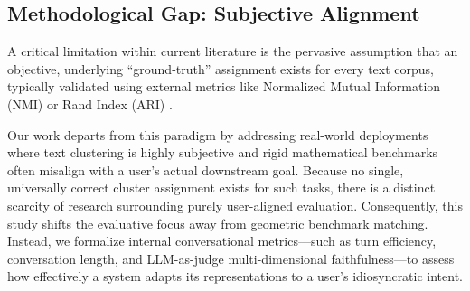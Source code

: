 \subsection{Methodological Gap: Subjective Alignment}
A critical limitation within current literature is the pervasive assumption that an objective, underlying ``ground-truth'' assignment exists for every text corpus, typically validated using external metrics like Normalized Mutual Information (NMI) or Rand Index (ARI) \cite{clusterllm, few_shot_clustering, llm_memcluster, optimized_algorithms}.

Our work departs from this paradigm by addressing real-world deployments where text clustering is highly subjective and rigid mathematical benchmarks often misalign with a user's actual downstream goal. 
Because no single, universally correct cluster assignment exists for such tasks, there is a distinct scarcity of research surrounding purely user-aligned evaluation. 
Consequently, this study shifts the evaluative focus away from geometric benchmark matching. 
Instead, we formalize internal conversational metrics—such as turn efficiency, conversation length, and LLM-as-judge multi-dimensional faithfulness—to assess how effectively a system adapts its representations to a user's idiosyncratic intent.